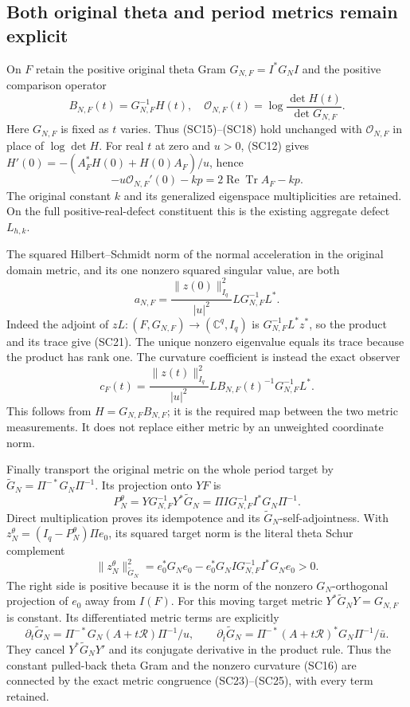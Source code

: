 \subsection{Both original theta and period metrics remain explicit}

On $F$ retain the positive original theta Gram
$G_{N,F}=I^*G_NI$ and the positive comparison operator
\[
 B_{N,F}(t)=G_{N,F}^{-1}H(t),\quad
 \mathcal O_{N,F}(t)=\log\frac{\det H(t)}{\det G_{N,F}}.
 \tag{SC19}
\]
Here $G_{N,F}$ is fixed as $t$ varies.  Thus (SC15)--(SC18) hold
unchanged with $\mathcal O_{N,F}$ in place of $\log\det H$.
For real $t$ at zero and $u>0$, (SC12) gives
$H'(0)=-(A_F^*H(0)+H(0)A_F)/u$, hence
\[
 -u\mathcal O_{N,F}'(0)-kp
   =2\operatorname{Re}\operatorname{Tr}A_F-kp.
 \tag{SC20}
\]
The original constant $k$ and its generalized eigenspace multiplicities
are retained.  On the full positive-real-defect constituent this is
the existing aggregate defect $L_{h,k}$.

The squared Hilbert--Schmidt norm of the normal acceleration in the
original domain metric, and its one nonzero squared singular value,
are both
\[
 a_{N,F}=\frac{\|z(0)\|_{I_q}^2}{|u|^2}
              L G_{N,F}^{-1}L^*.
 \tag{SC21}
\]
Indeed the adjoint of $zL:(F,G_{N,F})\to(\mathbb C^q,I_q)$ is
$G_{N,F}^{-1}L^*z^*$, so the product and its trace give (SC21).
The unique nonzero eigenvalue equals its trace because the product
has rank one.  The curvature coefficient is instead the exact observer
\[
 c_F(t)=\frac{\|z(t)\|_{I_q}^2}{|u|^2}
       L B_{N,F}(t)^{-1}G_{N,F}^{-1}L^*.
 \tag{SC22}
\]
This follows from $H=G_{N,F}B_{N,F}$; it is the required map
between the two metric measurements.  It does not replace either
metric by an unweighted coordinate norm.

Finally transport the original metric on the whole period target by
$\widetilde G_N=\Pi^{-*}G_N\Pi^{-1}$.  Its projection onto $YF$ is
\[
 P_N^\theta
   =Y G_{N,F}^{-1}Y^*\widetilde G_N
   =\Pi I G_{N,F}^{-1}I^*G_N\Pi^{-1}.
 \tag{SC23}
\]
Direct multiplication proves its idempotence and its
$\widetilde G_N$-self-adjointness.  With
$z_N^\theta=(I_q-P_N^\theta)\Pi e_0$, its squared target norm is
the literal theta Schur complement
\[
 \|z_N^\theta\|_{\widetilde G_N}^2
   =e_0^*G_Ne_0-e_0^*G_NI G_{N,F}^{-1}I^*G_Ne_0>0.
 \tag{SC24}
\]
The right side is positive because it is the norm of the nonzero
$G_N$-orthogonal projection of $e_0$ away from $I(F)$.
For this moving target metric $Y^*\widetilde G_NY=G_{N,F}$ is
constant.  Its differentiated metric terms are explicitly
\[
 \partial_t\widetilde G_N
       =\Pi^{-*}G_N(A+t\mathcal R)\Pi^{-1}/u,
 \qquad
 \partial_{\bar t}\widetilde G_N
       =\Pi^{-*}(A+t\mathcal R)^*G_N\Pi^{-1}/\bar u.
 \tag{SC25}
\]
They cancel $Y^*\widetilde G_NY'$ and its conjugate derivative in
the product rule.  Thus the constant pulled-back theta Gram and the
nonzero curvature (SC16) are connected by the exact metric
congruence (SC23)--(SC25), with every term retained.

